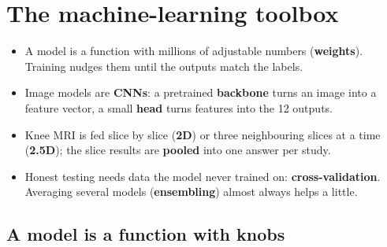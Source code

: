 \chapter{The machine-learning toolbox}
\label{ch:toolbox}

\begin{tldr}
\begin{itemize}
\item A model is a function with millions of adjustable numbers (\textbf{weights}). Training nudges them until the
      outputs match the labels.
\item Image models are \textbf{CNNs}: a pretrained \textbf{backbone} turns an image into a feature vector, a small
      \textbf{head} turns features into the 12 outputs.
\item Knee MRI is fed slice by slice (\textbf{2D}) or three neighbouring slices at a time (\textbf{2.5D}); the
      slice results are \textbf{pooled} into one answer per study.
\item Honest testing needs data the model never trained on: \textbf{cross-validation}. Averaging several models
      (\textbf{ensembling}) almost always helps a little.
\end{itemize}
\end{tldr}

\section{A model is a function with knobs}

